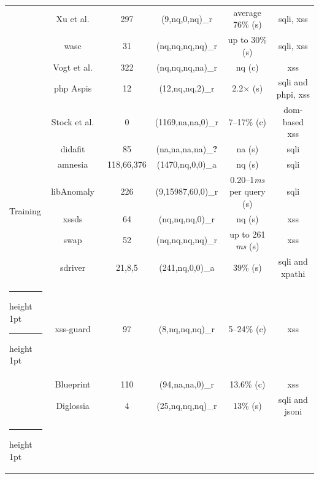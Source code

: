 \documentclass[10pt,journal,compsoc]{IEEEtran}
\makeatletter
\newcommand{\xmark}{\ding{56}}
\newcommand{\thickhline}{%
    \noalign {\ifnum 0=`}\fi \hrule height 1pt
    \futurelet \reserved@a \@xhline
}
\makeatother
\begin{document}
\begin{table}[t]
\begin{threeparttable}
\begin{small}
{\begin{tabular}{l|c|c|cc|c}
  &   Xu et al.~\cite{XBS06} & 297 & (9,{\sc nq},0,{\sc nq})\_r & average 76\% ({\sc s}) & {\sc sql}i, {\sc xss} \\ 
  &   {\sc wasc}~\cite{NLC07} & 31 & ({\sc nq},{\sc nq},{\sc nq},{\sc nq})\_r & up to 30\% ({\sc s}) & {\sc sql}i, {\sc xss} \\
  &   Vogt et al.~\cite{VFJKKV07} & 322 & ({\sc nq},{\sc nq},{\sc nq},{\sc na})\_r & {\sc nq} ({\sc c}) & {\sc xss} \\
  &   {\sc php} Aspis~\cite{PMP11} & 12 & (12,{\sc nq},{\sc nq},2)\_r & 2.2$\times$ ({\sc s}) & {\sc sql}i and {\sc php}i, {\sc xss} \\
  &   Stock et al.~\cite{SLMS14} & 0 & (1169,{\sc na},{\sc na},0)\_r & 7--17\% ({\sc c}) & {\sc dom}-based {\sc xss} \\
  \hline 
  \multirow{6}{*}{Training}
  &   {\sc didafit}~\cite{LLW02} & 85 & ({\sc na},{\sc na},{\sc na},{\sc na})\_{\bf ?} & {\sc na} ({\sc s}) & {\sc sql}i \\
  &   {\sc amnesia}~\cite{HO05,HO06,HO05b} & 118,66,376 & (1470,{\sc nq},0,0)\_a & {\sc nq} ({\sc s}) & {\sc sql}i \\ 
  &   libAnomaly~\cite{VMV05} & 226 & (9,15987,60,0)\_r & 0.20--1{\it ms} per query ({\sc s}) & {\sc sql}i \\
  &   {\sc xssds}~\cite{JEP08} & 64 & ({\sc nq},{\sc nq},{\sc nq},0)\_r & {\sc nq} ({\sc s}) & {\sc xss} \\
  &   {\sc swap}~\cite{WPLKK09} & 52 & ({\sc nq},{\sc nq},{\sc nq},{\sc nq})\_r & up to 261 {\it ms} ({\sc s}) & {\sc xss} \\ 
  &   {\sc sd}river~\cite{MS09,MKS09,MKLS11} & 21,8,5 & (241,{\sc nq},0,0)\_a & 39\% ({\sc s}) & {\sc sql}i and {\sc xp}athi \\
  \thickhline
  \thickhline
  \multirow{3}{*}{Hybrid}
  &   {\sc xss-guard}~\cite{BV08} & 97 & (8,{\sc nq},{\sc nq},{\sc nq})\_r & 5--24\% ({\sc c}) & {\sc xss} \\
  &   Blueprint~\cite{LV09} & 110 & (94,{\sc na},{\sc na},0)\_r & 13.6\% ({\sc c}) & {\sc xss} \\
  &   Diglossia~\cite{SMS13} & 4 & (25,{\sc nq},{\sc nq},{\sc nq})\_r & 13\% ({\sc s}) & {\sc sql}i and {\sc json}i \\
  \thickhline
    \end{tabular}}
    \begin{tablenotes}

\end{tablenotes}
\end{small}
\end{threeparttable}
\end{table}
\end{document}
